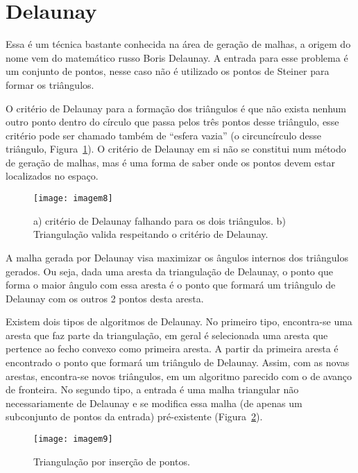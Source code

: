 \section{Delaunay}

Essa é um técnica bastante conhecida na área de geração de malhas, a origem do nome vem do matemático russo Boris Delaunay. A entrada para esse problema é um conjunto de pontos, nesse caso não é utilizado os pontos de Steiner para formar os triângulos.

O critério de Delaunay para a formação dos triângulos é que não exista nenhum outro ponto dentro do círculo que passa pelos três pontos desse triângulo, esse critério pode ser chamado também de “esfera vazia” (o circuncírculo desse triângulo, Figura~\ref{fig:imagem8}). O critério de Delaunay em si não se constitui num método de geração de malhas, mas é uma forma de saber onde os pontos devem estar localizados no espaço.

 \begin{figure}[htbp]
     \centering
     \texttt{[image: imagem8]}
     \caption{a) critério de Delaunay falhando para os dois triângulos. b) Triangulação valida respeitando o critério de Delaunay.} 
     \label{fig:imagem8}
 \end{figure}

A malha gerada por Delaunay visa maximizar os ângulos internos dos triângulos gerados. Ou seja, dada uma aresta da triangulação de Delaunay, o ponto que forma o maior ângulo com essa aresta é o ponto que formará um triângulo de Delaunay com os outros 2 pontos desta aresta.

Existem dois tipos de algoritmos de Delaunay. No primeiro tipo, encontra-se uma aresta que faz parte da triangulação, em geral é selecionada uma aresta que pertence ao fecho convexo como primeira aresta. A partir da primeira aresta é encontrado o ponto que formará um triângulo de Delaunay. Assim, com as novas arestas, encontra-se novos triângulos, em um algoritmo parecido com o de avanço de fronteira. No segundo tipo, a entrada é uma malha triangular não necessariamente de Delaunay e se modifica essa malha (de apenas um subconjunto de pontos da entrada) pré-existente (Figura~\ref{fig:imagem9}).

 \begin{figure}[htbp]
     \centering
     \texttt{[image: imagem9]}
     \caption{Triangulação por inserção de pontos. \cite{bib:Freitas10}} 
     \label{fig:imagem9}
 \end{figure}

